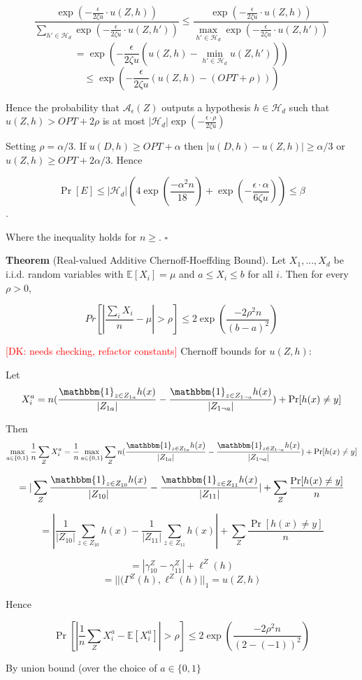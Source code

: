 \documentclass[format = sigconf]{acmart}
\newcommand{\dk}[1]{\textcolor{red}{[DK: #1]}}
\newcommand{\A}{\mathcal{A}}
\renewcommand{\H}{\mathcal{H}}
\newcommand{\1}{\mathbbm{1}}
\newcommand{\eps}{\epsilon}
\newcommand{\zt}{\zeta}
\newcommand{\z}[1]{Z_{#1}}
\theoremstyle{definition}
\begin{document}
$$\frac{\exp(-\frac{\eps}{2\zt u} \cdot u(Z,h))}{\sum_{h'\in\H_d}\exp(-\frac{\eps}{2\zt u} \cdot u(Z,h'))} \leq \frac{\exp(-\frac{\eps}{2\zt u} \cdot u(Z,h))}{\max_{h'\in\H_d}\exp(-\frac{\eps}{2\zt u} \cdot u(Z,h'))} $$
$$= \exp(-\frac{\eps}{2\zt u}(u(Z,h) - \min_{h'\in\H_d}u(Z,h')))$$
$$\leq \exp(-\frac{\eps}{2\zt u}(u(Z,h) - (OPT + \rho)))$$

Hence the probability that $\A_\eps(Z)$ outputs a hypothesis $h \in \H_d$ such that $u(Z,h) > OPT + 2\rho$ is at most $|\H_d|\exp(-\frac{\eps\cdot\rho}{2\zt u})$

Setting $\rho = \alpha/3$. If $u(D,h) \geq OPT + \alpha$ then $|u(D,h) - u(Z,h)| \geq \alpha/3$ or $u(Z,h) \geq OPT + 2\alpha/3$. Hence

$$\Pr[E] \leq |\H_d|(4\exp(\frac{-\alpha^2n}{18}) + \exp(-\frac{\eps\cdot\alpha}{6\zt u})) \leq \beta$$.

Where the inequality holds for $n \geq $. $\square$

{\bf Theorem} (Real-valued Additive Chernoff-Hoeffding Bound). Let $X_1,...,X_d$ be i.i.d. random variables with $\mathbb{E}[X_i] = \mu$ and $a \leq X_i \leq b$ for all $i$. Then for every $\rho > 0$,

$$Pr[|\frac{\sum_i X_i}{n} - \mu| > \rho] \leq 2\exp(\frac{-2\rho^2n}{(b-a)^2})$$

\dk {needs checking, refactor constants}
Chernoff bounds for $u(Z,h)$:

Let $$X_i^a = n(\frac{\1_{z\in Z_{1a}}h(x)}{|Z_{1a}|} - \frac{\1_{z\in Z_{1\neg a}}h(x)}{|Z_{1 \neg a}|} ) + \Pr[h(x) \neq y]$$

Then $$\max_{a\in \{0,1\}}\frac{1}{n} \sum_Z X_i^a =\frac{1}{n}  \max_{a\in \{0,1\}} \sum_Z n(\frac{\1_{z\in Z_{1a}}h(x)}{|Z_{1a}|} - \frac{\1_{z\in Z_{1\neg a}}h(x)}{|Z_{1 \neg a}|} ) + \Pr[h(x) \neq y]$$

$$= |\sum_Z \frac{\1_{z\in \z{10}}h(x)}{|\z{10}|} - \frac{\1_{z\in Z_{11}}h(x)}{|Z_{11}|}| +  \sum_Z \frac{\Pr[h(x) \neq y] }{n}$$

$$= |\frac{1}{|\z{10}|} \sum_{z\in \z{10}} h(x) - \frac{1}{|Z_{11}|} \sum_{z\in Z_{11}} h(x)| +  \sum_Z \frac{\Pr[h(x) \neq y] }{n}$$

$$=|\gamma_{10}^Z - \gamma_{11}^Z| + \ell^Z(h) $$
$$=||(\Gamma^Z(h), \ell^Z(h)||_{1} = u(Z,h)$$

Hence

$$\Pr[|\frac{1}{n} \sum_Z X_i^a - \mathbb{E}[X_i^a]| > \rho] \leq 2\exp(\frac{-2\rho^2n}{(2-(-1))^2})$$

By union bound (over the choice of $a \in \{0,1\}$
\end{document}
